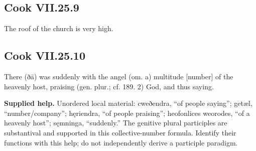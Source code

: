\par\begin{minipage}{\linewidth}\raggedright
\subsection*{Cook VII.25.9}

The roof of the church is very high.

\end{minipage}\par\addvspace{4pt}

\par\begin{minipage}{\linewidth}\raggedright
\subsection*{Cook VII.25.10}

There (ðā) was suddenly with the angel (om. a) multitude [number] of the heavenly host, praising (gen. plur.; cf. 189. 2) God, and thus saying.

\end{minipage}\par\addvspace{4pt}

\textbf{Supplied help.} Unordered local material: cweðendra, “of people saying”; getæl, “number/\allowbreak{}company”; hęriendra, “of people praising”; heofonlices weorodes, “of a heavenly host”; sęmninga, “suddenly.” The genitive plural participles are substantival and supported in this collective-number formula. Identify their functions with this help; do not independently derive a participle paradigm.

